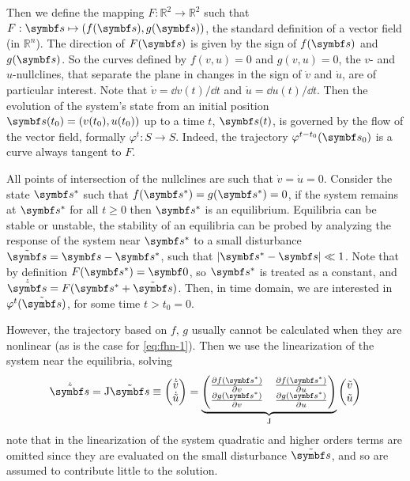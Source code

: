 Then we define the mapping $F:\mathbb{R}^2 \to \mathbb{R}^2$ such that $F: \vb{s} \mapsto \left(f(\vb{s}), g(\vb{s})\right)$, the standard definition of a vector field (in $\mathbb{R}^n$). 
The direction of $F(\vb{s})$ is given by the sign of $f(\vb{s})$ and $g(\vb{s})$. So the curves defined by $f(v, u) = 0$ and $g(v, u) = 0$, the $v$- and $u$-nullclines, that separate the plane in changes in the sign of $\dot{v}$ and $\dot{u}$, are of particular interest.
Note that $\dot{v} = \dd v(t)/\dd t$ and $\dot{u} = \dd u(t)/ \dd t$. 
Then the evolution of the system's state from an initial position $\vb{s}(t_0) = (v(t_0), u(t_0))$ up to a time $t$, $\vb{s}(t)$, is governed by the flow of the vector field, formally $\varphi^{t}: S \to S$.
Indeed, the trajectory $\varphi^{t - t_0} (\vb{s}_0)$ is a curve always tangent to $F$.

All points of intersection of the nullclines are such that $\dot{v} = \dot{u} = 0$. 
Consider the state $\vb{s}^*$ such that $f(\vb{s}^*) = g(\vb{s}^*) = 0$, if the system remains at $\vb{s}^*$ for all $t \geq 0$ then $\vb{s}^*$ is an equilibrium.
Equilibria can be stable or unstable, the stability of an equilibria can be probed by analyzing the response of the system near $\vb{s}^*$ to a small disturbance $\tilde{\vb{s}} = \vb{s} - \vb{s}^*$, such that $\left|\vb{s}^* - \vb{s}\right| \ll 1$. 
Note that by definition $F(\vb{s}^*) = \vb{0}$, so $\vb{s}^*$ is treated as a constant, and $\dot{\tilde{\vb{s}}} = F(\vb{s}^* + \tilde{\vb{s}})$.
Then, in time domain, we are interested in $\varphi^{t}(\tilde{\vb{s}})$, for some time $t > t_0 = 0$. 

However, the trajectory based on $f\text{, } g$ usually cannot be calculated when they are nonlinear (as is the case for \ref{eq:fhn-1}). 
Then we use the linearization of the system near the equilibria, solving
\begin{equation}
    \label{eq:lin-sys}
    \dot{\tilde{\vb{s}}} = \mathrm{J}\tilde{\vb{s}}
    \equiv
    \begin{pmatrix}
        \dot{\tilde{v}} \\
        \dot{\tilde{u}}
    \end{pmatrix}
    =
    \underbrace{
    \begin{pmatrix}
        \pdv{f(\vb{s}^*)}{v} & \pdv{f(\vb{s}^*)}{u} \\
        \pdv{g(\vb{s}^*)}{v} & \pdv{g(\vb{s}^*)}{u}
    \end{pmatrix}
    }_{\mathrm{J}}
    \begin{pmatrix}
        \tilde{v} \\
        \tilde{u}
    \end{pmatrix}
\end{equation}
note that in the linearization of the system quadratic and higher orders terms are omitted since they are evaluated on the small disturbance $\tilde{\vb{s}}$, and so are assumed to contribute little to the solution.

